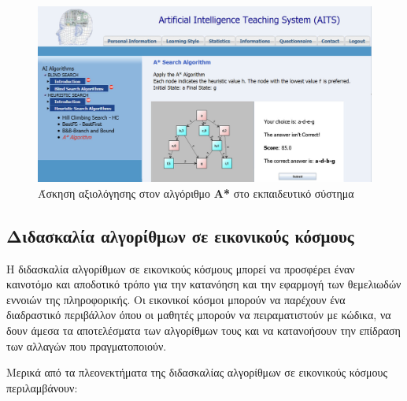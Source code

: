 \begin{figure}[H]
    \centering
    \includegraphics[width=0.8\linewidth]{sections/3/images/aits}
    \caption{Άσκηση αξιολόγησης στον αλγόριθμο \textbf{A*} στο εκπαιδευτικό σύστημα}
    \label{fig:aits}
\end{figure}


\subsection{Διδασκαλία αλγορίθμων σε εικονικούς κόσμους}

Η διδασκαλία αλγορίθμων σε εικονικούς κόσμους μπορεί να προσφέρει έναν καινοτόμο και αποδοτικό τρόπο για την κατανόηση και την εφαρμογή των θεμελιωδών εννοιών της πληροφορικής. Οι εικονικοί κόσμοι μπορούν να παρέχουν ένα διαδραστικό περιβάλλον όπου οι μαθητές μπορούν να πειραματιστούν με κώδικα, να δουν άμεσα τα αποτελέσματα των αλγορίθμων τους και να κατανοήσουν την επίδραση των αλλαγών που πραγματοποιούν.

Μερικά από τα πλεονεκτήματα της διδασκαλίας αλγορίθμων σε εικονικούς κόσμους περιλαμβάνουν:

